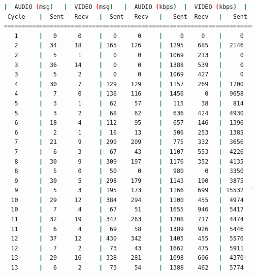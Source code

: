 \begin{lstlisting}[language=bash,basicstyle=\ttfamily\scriptsize]
          |  AUDIO (msg)   |  VIDEO (msg)   |  AUDIO (kbps)  |  VIDEO (kbps)  |   CPU (%)
 Cycle    |  Sent   Recv   |  Sent   Recv   |   Sent  Recv   |   Sent  Recv   | Program System
============================================================================================
   1      |   0      0     |   0      0     |     0     0    |     0     0    |   0      0
   2      |  34     18     | 165    126     |  1295    685   |  2146   1638   |  37     71
   2      |   5      1     |   0      0     |  1069    213   |     0      0   |  58     73
   3      |  36     14     |   0      0     |  1388    539   |     0      0   |  47     78
   3      |   5      2     |   0      0     |  1069    427   |     0      0   |  58     77
   4      |  30      7     | 129    129     |  1157    269   |  1700   1697   |  31     76
   4      |   7      0     | 136    116     |  1456      0   |  9658   8236   |  31     76
   5      |   3      1     |  62     57     |   115     38   |   814    751   |  36     20
   5      |   3      2     |  68     62     |   636    424   |  4930   4481   |  19     21
   6      |  18      4     | 112     95     |   657    146   |  1396   1186   |  23     76
   6      |   2      1     |  16     13     |   506    253   |  1385   1108   |  30     70
   7      |  21      9     | 290    209     |   775    332   |  3656   2638   |  25     71
   7      |   6      3     |  67     43     |  1107    553   |  4226   2700   |  16     73
   8      |  30      9     | 309    197     |  1176    352   |  4135   2634   |  33     75
   8      |   5      0     |  50      0     |   980      0   |  3350      0   |  41     74
   9      |  30      5     | 298    179     |  1143    190   |  3875   2331   |  36     71
   9      |   5      3     | 195    173     |  1166    699   | 15532  13778   |  21     69
  10      |  29     12     | 384    294     |  1100    455   |  4974   3806   |  37     70
  10      |   7      4     |  67     51     |  1655    946   |  5417   4123   |  21     73
  11      |  32     19     | 347    263     |  1208    717   |  4474   3390   |  27     69
  11      |   6      4     |  69     58     |  1389    926   |  5446   4591   |  49     66
  12      |  37     12     | 430    342     |  1405    455   |  5576   4434   |  32     71
  12      |   7      2     |  73     43     |  1662    475   |  5911   3475   |  21     73
  13      |  29     16     | 338    281     |  1098    606   |  4370   3632   |  24     74
  13      |   6      2     |  73     54     |  1388    462   |  5774   4271   |  49     73

\end{lstlisting}
